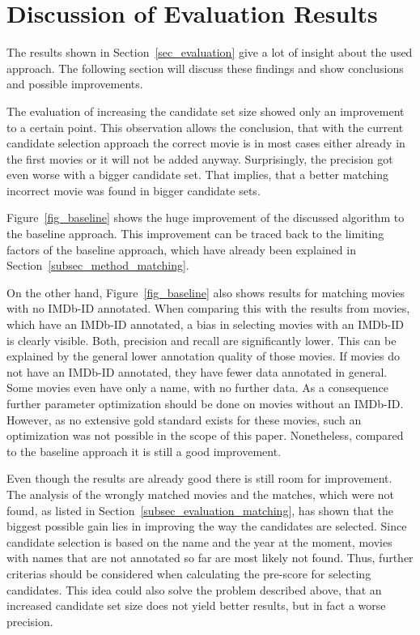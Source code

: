 \section{Discussion of Evaluation Results}
\label{sec_discussion}

The results shown in Section~\ref{sec_evaluation} give a lot of insight about the used approach.
The following section will discuss these findings and show conclusions and possible improvements.

The evaluation of increasing the candidate set size showed only an improvement to a certain point.
This observation allows the conclusion, that with the current candidate selection approach the correct movie is in most cases either already in the first movies or it will not be added anyway.
Surprisingly, the precision got even worse with a bigger candidate set.
That implies, that a better matching incorrect movie was found in bigger candidate sets.

Figure~\ref{fig_baseline} shows the huge improvement of the discussed algorithm to the baseline approach.
This improvement can be traced back to the limiting factors of the baseline approach, which have already been explained in Section~\ref{subsec_method_matching}.

On the other hand, Figure~\ref{fig_baseline} also shows results for matching movies with no IMDb-ID annotated.
When comparing this with the results from movies, which have an IMDb-ID annotated, a bias in selecting movies with an IMDb-ID is clearly visible.
Both, precision and recall are significantly lower.
This can be explained by the general lower annotation quality of those movies.
If movies do not have an IMDb-ID annotated, they have fewer data annotated in general.
Some movies even have only a name, with no further data.
As a consequence further parameter optimization should be done on movies without an IMDb-ID.
However, as no extensive gold standard exists for these movies, such an optimization was not possible in the scope of this paper.
Nonetheless, compared to the baseline approach it is still a good improvement.

Even though the results are already good there is still room for improvement.
The analysis of the wrongly matched movies and the matches, which were not found, as listed in Section~\ref{subsec_evaluation_matching}, has shown that the biggest possible gain lies in improving the way the candidates are selected.
Since candidate selection is based on the name and the year at the moment, movies with names that are not annotated so far are most likely not found.
Thus, further criterias should be considered when calculating the pre-score for selecting candidates.
This idea could also solve the problem described above, that an increased candidate set size does not yield better results, but in fact a worse precision.

